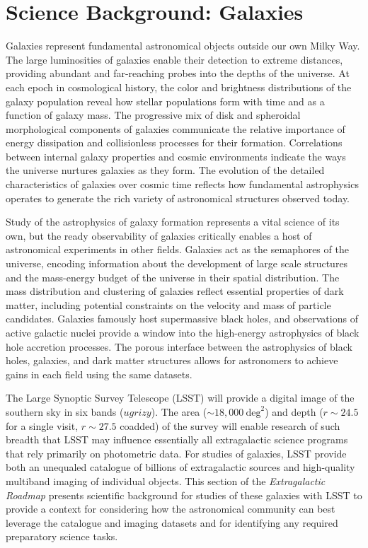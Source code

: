 

\section{Science Background: Galaxies}
\label{sec:sci:gal:bkgnd}

Galaxies represent fundamental astronomical objects
outside our own Milky Way. 
The large luminosities of galaxies enable their 
detection to extreme distances, providing abundant
and far-reaching probes into the depths of the universe.
At each epoch in cosmological history, the color
and brightness distributions of the galaxy population
reveal how stellar populations form with time and
as a function of galaxy mass. The progressive mix of
disk and spheroidal morphological components of 
galaxies communicate the relative importance of
energy dissipation and collisionless processes
for their formation.
Correlations between internal galaxy properties and
cosmic environments indicate
the ways the universe nurtures galaxies as they form.
The evolution of the
detailed characteristics of galaxies over cosmic time
reflects how fundamental astrophysics
operates to generate the rich variety of 
astronomical structures observed today.

Study of the astrophysics of galaxy formation represents
a vital science of its own, but the ready
observability of galaxies critically enables a host of
astronomical experiments in other fields. 
Galaxies act as the semaphores of the
universe, encoding information about
the development of large scale
structures and the mass-energy budget of the
universe in their spatial distribution. The mass distribution
and clustering of galaxies reflect essential
properties of dark matter, including potential
constraints on the velocity and mass of particle candidates.
Galaxies famously host supermassive black holes, 
and observations of active galactic nuclei provide
a window into the high-energy astrophysics of black hole
accretion processes. The porous interface between the
astrophysics of black holes, galaxies, and 
dark matter structures allows for astronomers to 
achieve gains in each field using the same datasets.

The Large Synoptic Survey Telescope (LSST) will provide a
digital image of the southern sky in six bands ($ugrizy$).
The area ($\sim18,000~\mathrm{deg}^2$) and depth 
($r\sim24.5$ for a single visit, $r\sim27.5$ coadded) of
the survey will enable research of such breadth
that LSST may influence essentially all extragalactic 
science programs that rely primarily on photometric data.
For studies of galaxies, LSST provide both an unequaled 
catalogue of billions of extragalactic sources and high-quality 
multiband imaging of individual objects. This section of
the {\it Extragalactic Roadmap} presents scientific
background for studies of these galaxies with LSST to provide a
context for considering how the astronomical community can
best leverage the catalogue and imaging datasets and for
identifying any required preparatory science tasks.

